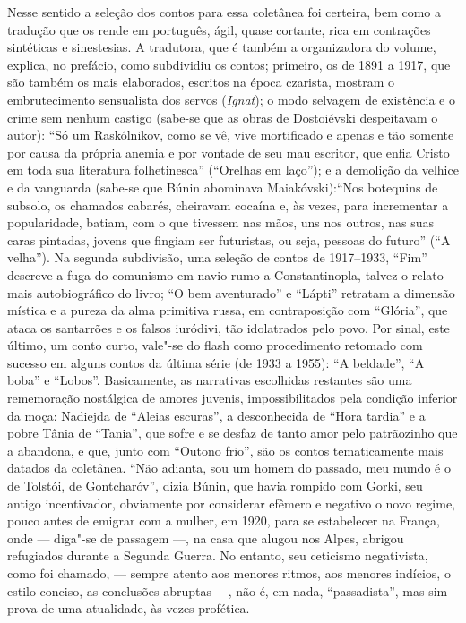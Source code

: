 Nesse sentido a seleção dos contos para essa coletânea foi certeira, bem como a tradução que os rende em português,  ágil, quase cortante, rica em contrações sintéticas e sinestesias. A tradutora, que é também a organizadora do volume, explica, no prefácio, como subdividiu os contos; primeiro, os de 1891 a 1917, que são também os mais elaborados, escritos na época czarista, mostram o embrutecimento sensualista  dos servos (\emph{Ignat}); o modo selvagem de existência e o crime sem nenhum castigo (sabe-se que as obras de Dostoiévski despeitavam o autor): ``Só um Raskólnikov, como se vê, vive mortificado e apenas e tão somente por causa da própria anemia e por vontade de seu mau escritor, que enfia Cristo em toda sua literatura folhetinesca'' (``Orelhas em laço''); e a demolição da velhice e da vanguarda (sabe-se que Búnin abominava Maiakóvski):``Nos botequins de subsolo, os chamados cabarés, cheiravam cocaína e, às vezes, para incrementar a popularidade, batiam, com o que tivessem nas mãos, uns nos outros, nas suas caras pintadas, jovens que fingiam ser futuristas, ou seja, pessoas do futuro'' (``A velha''). Na segunda subdivisão, uma seleção de contos de 1917--1933, ``Fim'' descreve a fuga do comunismo em navio rumo a Constantinopla, talvez o relato mais autobiográfico do livro; ``O bem aventurado'' e ``Lápti'' retratam  a dimensão mística e a pureza da alma primitiva russa, em contraposição com ``Glória'', que ataca os santarrões e os falsos iuródivi, tão idolatrados pelo povo. Por sinal, este último, um conto curto, vale"-se do flash como procedimento retomado com sucesso em alguns contos da última série (de 1933 a 1955): ``A beldade'', ``A boba'' e ``Lobos''. Basicamente, as narrativas escolhidas restantes são uma rememoração nostálgica de amores juvenis, impossibilitados pela condição inferior da moça: Nadiejda de ``Aleias escuras'', a desconhecida de ``Hora tardia'' e a pobre Tânia de ``Tania'', que sofre e se desfaz de tanto amor pelo patrãozinho que a abandona, e que, junto com ``Outono frio'', são os contos tematicamente mais datados da coletânea. ``Não adianta, sou um homem do passado, meu mundo é o de Tolstói, de Gontcharóv'', dizia Búnin, que havia rompido com Gorki, seu antigo incentivador, obviamente por considerar efêmero e negativo o novo regime, pouco antes de emigrar com a mulher, em 1920, para se estabelecer na França, onde --- diga"-se de passagem ---,  na casa que alugou nos Alpes, abrigou refugiados durante a Segunda Guerra. No entanto, seu ceticismo negativista, como foi chamado, --- sempre atento aos menores ritmos, aos menores indícios, o estilo conciso, as conclusões abruptas ---, não é, em nada, ``passadista'', mas sim prova de uma atualidade, às vezes profética. 

